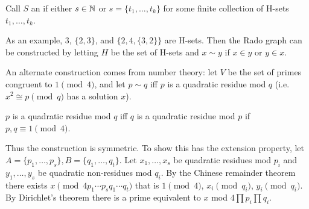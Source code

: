 \documentclass[main.tex]{subfiles}
\begin{document}
\begin{definition*}[H-set]
  Call $S$ an  if either $s\in\mathbb N$ or $s = \{t_1,\ldots,t_k\}$
  for some finite collection of H-sets $t_1,\ldots,t_k$.
\end{definition*}
As an example, $3$, $\{2,3\}$, and $\{2, 4, \{3, 2\}\}$ are H-sets.
Then the Rado graph can be constructed by letting $H$ be the set of H-sets
and $x\sim y$ if $x\in y$ or $y\in x$.

An alternate construction comes from number theory: let $V$ be the set of primes
congruent to $1\pmod 4$, and let $p\sim q$ iff $p$ is a quadratic residue mod $q$
(i.e. $x^2\cong p\pmod q$ has a solution $x$).
\begin{theorem}[Gauss]
  $p$ is a quadratic residue mod $q$ iff $q$ is a quadratic residue mod $p$
  if $p,q\equiv 1\pmod 4$.
\end{theorem}
Thus the construction is symmetric.
To show this has the extension property,
let $A = \{p_1,\ldots,p_s\}, B = \{q_1,\ldots,q_t\}$.
Let $x_1,\ldots,x_s$ be quadratic residues mod $p_i$ and
$y_1,\ldots,y_s$ be quadratic non-residues mod $q_i$.
By the Chinese remainder theorem there exists
$x\pmod{4p_1\cdots p_sq_1\cdots q_t}$ that is $1\pmod 4$, $x_i\pmod{q_i}$,
$y_i\pmod q_i$.
By Dirichlet's theorem there is a prime equivalent to $x$ mod $4\prod p_i\prod q_i$.
\end{document}
